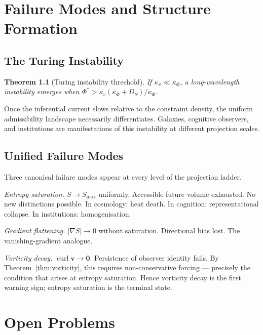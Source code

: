 \documentclass[12pt, oneside]{book}
\theoremstyle{plain}
\newtheorem{theorem}{Theorem}[chapter]
\theoremstyle{definition}
\newcommand{\vfield}{\mathbf{v}}
\newcommand{\nab}{\nabla}
\DeclareMathOperator{\curlop}{curl}
\begin{document}
\chapter{Failure Modes and Structure Formation}
\label{ch:failure}

\section{The Turing Instability}
\label{sec:turing}

\begin{theorem}[Turing instability threshold]
If $\kappa_v\ll\kappa_\Phi$, a long-wavelength instability emerges when
$\Phi^*>\kappa_v(\kappa_\Phi+D_S)/\kappa_\Phi$.
\end{theorem}

Once the inferential current slows relative to the constraint density, the uniform
admissibility landscape necessarily differentiates. Galaxies, cognitive observers,
and institutions are manifestations of this instability at different projection
scales.

\section{Unified Failure Modes}
\label{sec:failures}

Three canonical failure modes appear at every level of the projection ladder.

\textit{Entropy saturation.} $S\to S_{\max}$ uniformly. Accessible future volume
exhausted. No new distinctions possible. In cosmology: heat death. In cognition:
representational collapse. In institutions: homogenisation.

\textit{Gradient flattening.} $|\nab S|\to 0$ without saturation. Directional bias
lost. The vanishing-gradient analogue.

\textit{Vorticity decay.} $\curlop\vfield\to\mathbf{0}$. Persistence of observer
identity fails. By Theorem~\ref{thm:vorticity}, this requires non-conservative
forcing --- precisely the condition that arises at entropy saturation. Hence vorticity
decay is the first warning sign; entropy saturation is the terminal state.

\chapter{Open Problems}
\label{ch:open}
\end{document}
